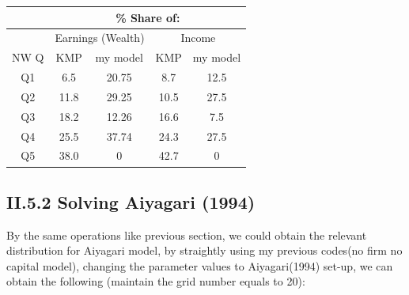 \documentclass{article}[a4paper]
\begin{document}
\begin{table}[htbp]
\centering
\begin{tabular}{@{}ccccc@{}}
\toprule
     & \multicolumn{4}{c}{\% Share of:}                                   \\ \midrule
     & \multicolumn{2}{c}{Earnings (Wealth)} & \multicolumn{2}{c}{Income} \\
NW Q & KMP             & my model            & KMP        & my model      \\
Q1   & 6.5             & 20.75               & 8.7        & 12.5          \\
Q2   & 11.8            & 29.25               & 10.5       & 27.5          \\
Q3   & 18.2            & 12.26               & 16.6       & 7.5           \\
Q4   & 25.5            & 37.74               & 24.3       & 27.5          \\
Q5   & 38.0            & 0                   & 42.7       & 0             \\ \bottomrule
\end{tabular}
\end{table}


\pagebreak
\subsection{II.5.2 Solving Aiyagari (1994)}
By the same operations like previous section, we could obtain the relevant distribution for Aiyagari model, by straightly using my previous codes(no firm no capital model), changing the parameter values to Aiyagari(1994) set-up, we can obtain the following (maintain the grid number equals to 20):
\end{document}
